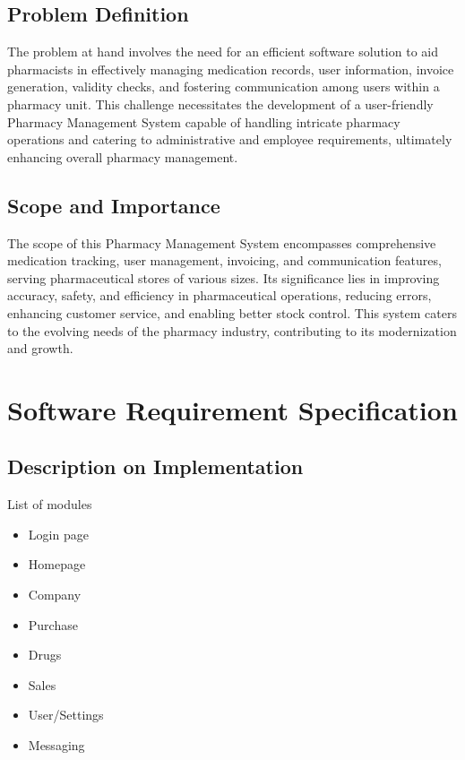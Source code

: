 \documentclass[12pt, letter paper]{report}
\begin{document}
\section{Problem Definition} 
The problem at hand involves the need for an efficient software solution to aid pharmacists in effectively managing medication records, user information, invoice generation, validity checks, and fostering communication among users within a pharmacy unit. This challenge necessitates the development of a user-friendly Pharmacy Management System capable of handling intricate pharmacy operations and catering to administrative and employee requirements, ultimately enhancing overall pharmacy management.
\section{Scope and Importance}
The scope of this Pharmacy Management System encompasses comprehensive medication tracking, user management, invoicing, and communication features, serving pharmaceutical stores of various sizes. Its significance lies in improving accuracy, safety, and efficiency in pharmaceutical operations, reducing errors, enhancing customer service, and enabling better stock control. This system caters to the evolving needs of the pharmacy industry, contributing to its modernization and growth.
\chapter{Software Requirement Specification}

\section{Description on Implementation} 
List of modules
\begin{itemize}
	
\item Login page
\item Homepage
\item Company
\item Purchase
\item Drugs
\item Sales
\item User/Settings
\item Messaging
\end{itemize}
\end{document}

